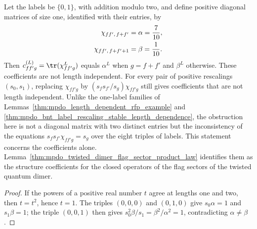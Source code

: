 \begin{lemma}%
    \label{thm:mpdo_twisted_dimer_two_label_rescaling_stable}
    \leanok
    Let the labels be $\{0,1\}$, with addition modulo two, and define
    positive diagonal matrices of size one, identified with their entries, by
    \begin{align}
        \chi_{ff',\,f+f'}   & =\alpha=\frac{7}{10},
        \notag                                      \\
        \chi_{ff',\,f+f'+1} & =\beta=\frac1{10}.
        \notag
    \end{align}
    Then $c^{(L)}_{ff'g}=\tr(\chi_{ff'g}^L)$ equals $\alpha^L$ when
    $g=f+f'$ and $\beta^L$ otherwise. These coefficients are not length
    independent. For every pair of positive rescalings $(s_0,s_1)$,
    replacing $\chi_{ff'g}$ by $(s_fs_{f'}/s_g)\chi_{ff'g}$ still gives
    coefficients that are not length independent. Unlike the
    one-label families of
    Lemmas~\ref{thm:mpdo_length_dependent_rfp_example} and
    \ref{thm:mpdo_bnt_label_rescaling_stable_length_dependence}, the
    obstruction here is not a diagonal matrix with two distinct entries but
    the inconsistency of the equations
    $s_fs_{f'}\chi_{ff'g}=s_g$ over the eight triples of labels.
    This statement concerns the coefficients alone.
    Lemma~\ref{thm:mpdo_twisted_dimer_flag_sector_product_law} identifies
    them as the structure coefficients for the closed operators of the flag
    sectors of the twisted quantum dimer.
\end{lemma}
\begin{proof}\leanok
    If the powers of a positive real number $t$ agree at lengths one and
    two, then $t=t^2$, hence $t=1$. The triples $(0,0,0)$ and
    $(0,1,0)$ give $s_0\alpha=1$ and $s_1\beta=1$; the triple $(0,0,1)$ then
    gives $s_0^2\beta/s_1=\beta^2/\alpha^2=1$, contradicting
    $\alpha\ne\beta$.
\end{proof}

